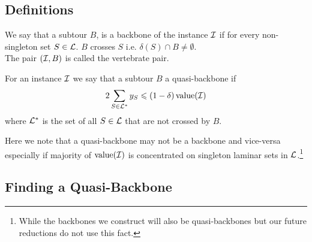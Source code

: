 \documentclass[./main.tex]{subfiles}
\begin{document}
	\subsection{Definitions}
	
	\begin{definition}
		We say that a subtour $B$, is a backbone of the instance $\mathcal{I}$ if for every non-singleton set $S \in \mathcal{L}$. $B$ crosses $S$ i.e. $\delta(S) \cap B \ne \emptyset$.\\
		The pair $(\mathcal{I}, B)$ is called the vertebrate pair.\\
	\end{definition}
	
	\begin{definition}
		For an instance $\mathcal{I}$ we say that a subtour $B$ a quasi-backbone if 
		\begin{equation}\label{def:6:q-bb}
			2\sum_{S \in \mathcal{L}^*} y_S \leqslant \left(1 - \delta\right)\textup{value}(\mathcal{I})
		\end{equation}
		where $\mathcal{L}^*$ is the set of all $S \in \mathcal{L}$ that are not crossed by $B$.
	\end{definition}
	
	Here we note that a quasi-backbone may not be a backbone and vice-versa especially if majority of $\textup{value}(\mathcal{I})$ is concentrated on singleton laminar sets in $\mathcal{L}$.\footnote{While the backbones we construct will also be quasi-backbones but our future reductions do not use this fact.}
	
	\subsection{Finding a Quasi-Backbone}
	
\end{document}
